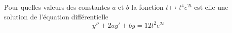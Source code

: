 
\begin{exercice}\label{exoEqsDiff0001}

Pour quelles valeurs des constantes $a$ et $b$ la fonction $t \mapsto t^4 e^{2t}$ est-elle une solution de l'équation différentielle
\[
y'' + 2ay' + by = 12 t^2 e^{2t}
\]

\end{exercice}
